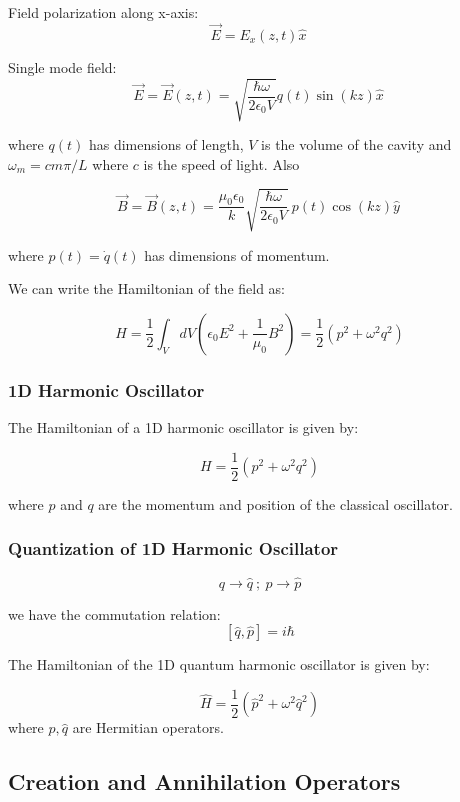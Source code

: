 \documentclass[
  letterpaper,
  DIV=11,
  numbers=noendperiod]{scrreprt}
\begin{document}
Field polarization along x-axis: \[\vec{E} = E_x(z, t) \hat{x}\ \]

Single mode field:
\[ \vec{E} = \vec{E}(z, t) = \sqrt{\frac{\hbar \omega}{2 \epsilon_0 V}} q(t)\sin(kz) \hat{x}\ \]

where \(q(t)\) has dimensions of length, \(V\) is the volume of the
cavity and \(\omega_m = cm\pi/L\) where \(c\) is the speed of light.
Also

\[ \vec{B} = \vec{B}(z, t) = \frac{\mu_0\epsilon_0}{k}\sqrt{\frac{\hbar \omega}{2 \epsilon_0 V}}\ p(t)\cos(kz) \hat{y}\ \]

where \(p(t) = \dot{q}(t)\) has dimensions of momentum.

We can write the Hamiltonian of the field as:

\[ H = \frac{1}{2} \int_V dV (\epsilon_0 E^2 + \frac{1}{\mu_0} B^2) = \frac{1}{2}(p^2 + \omega^2 q^2) \]

\subsubsection*{1D Harmonic Oscillator}\label{d-harmonic-oscillator}

The Hamiltonian of a 1D harmonic oscillator is given by:

\[ H = \frac{1}{2}(p^2 + \omega^2 q^2) \]

where \(p\) and \(q\) are the momentum and position of the classical
oscillator.

\subsubsection*{Quantization of 1D Harmonic
Oscillator}\label{quantization-of-1d-harmonic-oscillator}

\[q\rightarrow \hat{q}\ ;\ p\rightarrow \hat{p}\]

we have the commutation relation: \[ [\hat{q}, \hat{p}] = i\hbar \]

The Hamiltonian of the 1D quantum harmonic oscillator is given by:

\[ \hat{H} = \frac{1}{2}(\hat{p}^2 + \omega^2 \hat{q}^2) \] where
\(\hat{p}, \hat{q}\) are Hermitian operators.

\subsection*{Creation and Annihilation
Operators}\label{creation-and-annihilation-operators}
\end{document}
